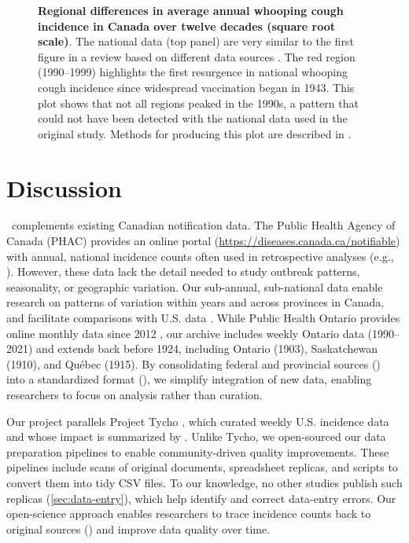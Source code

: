 \documentclass[12pt]{article}
\begin{document}
\begin{figure}[!ht]
  \caption{\textbf{Regional \cite{SGC2021} differences in average annual whooping cough incidence in Canada over twelve decades (square root scale)}. The national data (top panel) are very similar to the first figure in a review based on different data sources \cite{thommes2020revisiting}. The red region (1990--1999) highlights the first resurgence in national whooping cough incidence since widespread vaccination began in 1943. This plot shows that not all regions peaked in the 1990s, a pattern that could not have been detected with the national data used in the original study. Methods for producing this plot are described in .}
  \label{fig:whooping-plot}
\end{figure}

\newpage

\section{Discussion}\label{sec:interpretation}

\datacronym\ complements existing Canadian notification data. The Public Health Agency of Canada (PHAC) provides an online portal \cite{totten2019updates} (\url{https://diseases.canada.ca/notifiable}) with annual, national incidence counts often used in retrospective analyses (e.g., \cite{payne2014hepatitis,gasmi2017emerging,lin2021relaying,lin2021influenza,thommes2020revisiting,golden2024ccdr}). However, these data lack the detail needed to study outbreak patterns, seasonality, or geographic variation. Our sub-annual, sub-national data enable research on patterns of variation within years and across provinces in Canada, and facilitate comparisons with U.S. data \cite{van2018project}. While Public Health Ontario provides online monthly data since 2012 \cite{phoquery}, our archive includes weekly Ontario data (1990--2021) and extends back before 1924, including Ontario (1903), Saskatchewan (1910), and Québec (1915). By consolidating federal and provincial sources () into a standardized format (), we simplify integration of new data, enabling researchers to focus on analysis rather than curation.

Our project parallels Project Tycho \cite{van2013contagious}, which curated weekly U.S. incidence data and whose impact is summarized by \cite{van2018project}. Unlike Tycho, we open-sourced our data preparation pipelines to enable community-driven quality improvements. These pipelines include scans of original documents, spreadsheet replicas, and scripts to convert them into tidy CSV files. To our knowledge, no other studies publish such replicas (\cref{sec:data-entry}), which help identify and correct data-entry errors. Our open-science approach enables researchers to trace incidence counts back to original sources () and improve data quality over time.
\end{document}
